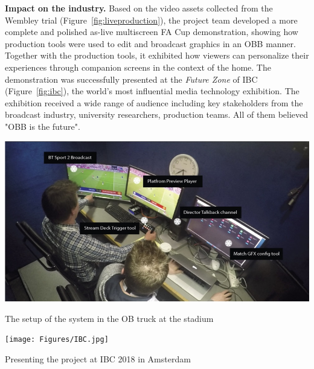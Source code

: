 \documentclass[sigchi-a, authorversion]{acmart}
\begin{document}
\vspace{5pt}\noindent\textbf{Impact on the industry.} Based on the video assets
collected from the Wembley trial (Figure~\ref{fig:liveproduction}), the project team developed a more complete and
polished as-live multiscreen FA Cup demonstration, showing how production
tools were used to edit and broadcast graphics in an OBB manner. Together with
the production tools, it exhibited how viewers can personalize their experiences
through companion screens in the context of the home. The
demonstration was successfully presented at the \emph{Future Zone} of IBC (Figure~\ref{fig:ibc}), the world's
most influential media technology exhibition. The exhibition received a wide
range of audience including key stakeholders from the broadcast industry,
university researchers, production teams. All of them believed "OBB is the future".

\begin{marginfigure}
    \vspace{2pc}
    \includegraphics[width=\marginparwidth]{Figures/liveproduction.jpg}
    \caption{The setup of the system in the OB truck at the stadium}
    \label{fig:liveproduction}
\end{marginfigure}

\begin{marginfigure}
    \texttt{[image: Figures/IBC.jpg]}
    \caption{Presenting the project at IBC 2018 in Amsterdam}
    \label{fig:ibc}
\end{marginfigure}
\end{document}
